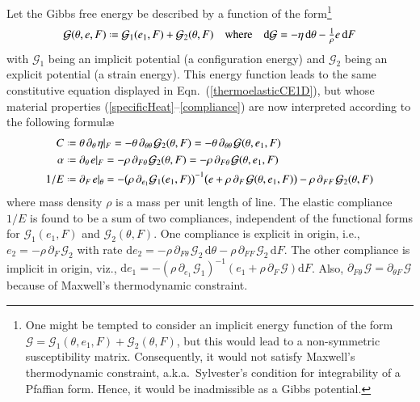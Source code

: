 Let the Gibbs free energy be described by a function of the form\footnote{
    One might be tempted to consider an implicit energy function of the form $\mathcal{G} = \mathcal{G}_1 (\theta ,  e_1 , F ) + \mathcal{G}_2 (\theta , F)$, but this would lead to a non-symmetric susceptibility matrix.  Consequently, it would not satisfy Maxwell's thermo\-dynamic constraint, a.k.a.\ Sylvester's condition for integrability of a Pfaffian form.  Hence, it would be inadmissible as a Gibbs potential.
}
\begin{equation}
\mathcal{G} (\theta , e , F) \defeq \mathcal{G}_1 ( e_1 , F ) + \mathcal{G}_2 ( \theta , F )
\quad \text{where} \quad
\mathrm{d} \mathcal{G} = -\eta \, \mathrm{d} \theta - 
\tfrac{1}{\rho} e \, \mathrm{d} F
\label{GibbsFreeEnergy}
\end{equation}
with $\mathcal{G}_1$ being an implicit potential (a configuration energy) and $\mathcal{G}_2$ being an explicit potential (a strain energy).  This energy function leads to the same constitutive equation displayed in Eqn.~(\ref{thermoelasticCE1D}), but whose material properties (\ref{specificHeat}--\ref{compliance}) are now interpreted according to the following formul\ae
\begin{subequations}
    \label{physicalFields1Dfiber}
    \begin{align}
    C & \defeq \theta \, \partial_{\theta\,} \eta |_F = 
    -\theta \, \partial_{\theta\theta\,} \mathcal{G}_2(\theta , F) =
    -\theta \, \partial_{\theta\theta\,} \mathcal{G} ( \theta , e_1 , F )
    \label{specificHeat1D} \\
    \alpha & \defeq \partial_{\theta\,} e |_F = 
    -\rho \, \partial_{F\theta\,} \mathcal{G}_2(\theta , F) =
    -\rho \, \partial_{F\theta\,} \mathcal{G} (\theta , e_1 , F)
    \label{thermalExpansion1D} \\
    1/E & \defeq \partial_{F\,} e |_{\theta} = -
    \bigl( \rho \, \partial_{e_1} \mathcal{G}_1 ( e_1, F ) \bigr)^{-1} 
    \bigl( e + \rho \, \partial_{F\,} \mathcal{G} (\theta , e_1 , F) \bigr) -
    \rho \, \partial_{FF\,} \mathcal{G}_2(\theta , F)
    \label{compliance1D}
    \end{align}
\end{subequations}
where mass density $\rho$ is a mass per unit length of line.  The elastic compliance $1/E$ is found to be a sum of two compliances, independent of the functional forms for $\mathcal{G}_1 ( e_1 , F )$ and $\mathcal{G}_2 ( \theta , F )$.  One compliance is explicit in origin, i.e., $e_2 = -\rho \, \partial_{F\,} \mathcal{G}_2$ with rate $\mathrm{d} e_2 = -\rho \, \partial_{F\theta\,} \mathcal{G}_2 \, \mathrm{d} \theta - \rho \, \partial_{FF\,} \mathcal{G}_2 \, \mathrm{d}F$.  The other compliance is implicit in origin, viz., $\mathrm{d} e_1 = - ( \rho \, \partial_{e_1 \,} \mathcal{G}_1 )^{-1} ( e_1 + \rho \, \partial_{F\,} \mathcal{G} ) \mathrm{d}F$.  Also, $\partial_{F\theta\,} \mathcal{G} = \partial_{\theta F\,} \mathcal{G}$ because of Maxwell's thermo\-dynamic constraint.

